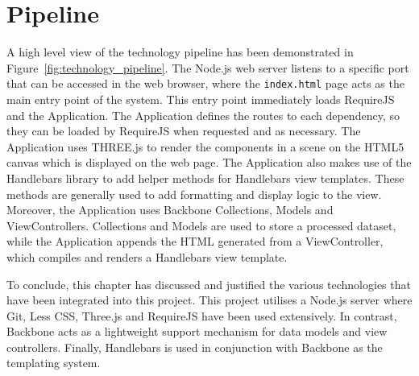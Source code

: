 \section{Pipeline} {
\label{sec:technology_pipeline}

	A high level view of the technology pipeline has been demonstrated in Figure~\ref{fig:technology_pipeline}. The Node.js web server listens to a specific port that can be accessed in the web browser, where the \texttt{index.html} page acts as the main entry point of the system. This entry point immediately loads RequireJS and the Application. The Application defines the routes to each dependency, so they can be loaded by RequireJS when requested and as necessary. The Application uses THREE.js to render the components in a scene on the HTML5 canvas which is displayed on the web page. The Application also makes use of the Handlebars library to add helper methods for Handlebars view templates. These methods are generally used to add formatting and display logic to the view. Moreover, the Application uses Backbone Collections, Models and ViewControllers. Collections and Models are used to store a processed dataset, while the Application appends the HTML generated from a ViewController, which compiles and renders a Handlebars view template.

	

}

To conclude, this chapter has discussed and justified the various technologies that have been integrated into this project. This project utilises a Node.js server where Git, Less CSS, Three.js and RequireJS have been used extensively. In contrast, Backbone acts as a lightweight support mechanism for data models and view controllers. Finally, Handlebars is used in conjunction with Backbone as the templating system.
